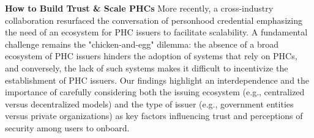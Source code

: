 
\textbf{How to Build Trust \& Scale PHCs}
More recently, a cross-industry collaboration \cite{adler2024personhood} resurfaced the conversation of personhood credential 
\cite{borge2017proof, ford2020identity, de2024personhood, sharma2024experts} emphasizing the need of an ecosystem for PHC issuers to facilitate scalability. A fundamental challenge remains the "chicken-and-egg" dilemma: the absence of a broad ecosystem of PHC issuers hinders the adoption of systems that rely on PHCs, and conversely, the lack of such systems makes it difficult to incentivize the establishment of PHC issuers. Our findings highlight an interdependence and the importance of carefully considering both the issuing ecosystem (e.g., centralized versus decentralized models) and the type of issuer (e.g., government entities versus private organizations) as key factors influencing trust and perceptions of security among users to onboard.



